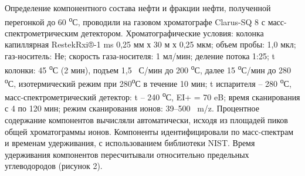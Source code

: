 \begin{multicols}{2}
Определение компонентного состава нефти и фракции нефти, полученной
перегонкой до 60 \textsuperscript{о}С, проводили на газовом хроматографе
Clarus-SQ 8 с масс-спектрометрическим детектором. Хроматографические
условия: колонка капиллярная RestekRxi®-1 ms 0,25 мм х 30 м х 0,25 мкм;
объем пробы: 1,0 мкл; газ-носитель: Не; скорость газа-носителя: 1
мл/мин; деление потока 1:25; t колонки: 45 \textsuperscript{о}С (2 мин),
подъем 1,5 ~С/мин до 200 \textsuperscript{о}С, далее 15
\textsuperscript{о}С/мин до 280 \textsuperscript{о}С, изотермический
режим при 280\textsuperscript{о}С в течение 10 мин; t испарителя -- 280
\textsuperscript{о}С, масс-спектрометрический детектор: t -- 240
\textsuperscript{о}С, EI+ = 70 eB; время сканирования с 4 по 120 мин;
режим сканирования ионов: 39--500 ~m/z. Процентное содержание
компонентов вычисляли автоматически, исходя из площадей пиков общей
хроматограммы ионов. Компоненты идентифицировали по масс-спектрам и
временам удерживания, с использованием библиотеки NIST. Время
удерживания компонентов пересчитывали относительно предельных
углеводородов (рисунок 2).
\end{multicols}

